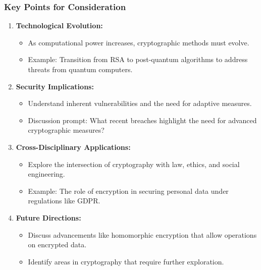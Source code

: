 \documentclass{beamer}
\begin{document}
\begin{frame}[fragile]
    \frametitle{Key Points for Consideration}
    \begin{enumerate}
        \item \textbf{Technological Evolution:}
            \begin{itemize}
                \item As computational power increases, cryptographic methods must evolve.
                \item Example: Transition from RSA to post-quantum algorithms to address threats from quantum computers.
            \end{itemize}
        \item \textbf{Security Implications:} 
            \begin{itemize}
                \item Understand inherent vulnerabilities and the need for adaptive measures.
                \item Discussion prompt: What recent breaches highlight the need for advanced cryptographic measures?
            \end{itemize}
        \item \textbf{Cross-Disciplinary Applications:}
            \begin{itemize}
                \item Explore the intersection of cryptography with law, ethics, and social engineering.
                \item Example: The role of encryption in securing personal data under regulations like GDPR.
            \end{itemize}
        \item \textbf{Future Directions:}
            \begin{itemize}
                \item Discuss advancements like homomorphic encryption that allow operations on encrypted data.
                \item Identify areas in cryptography that require further exploration.
            \end{itemize}
    \end{enumerate}
\end{frame}
\end{document}
